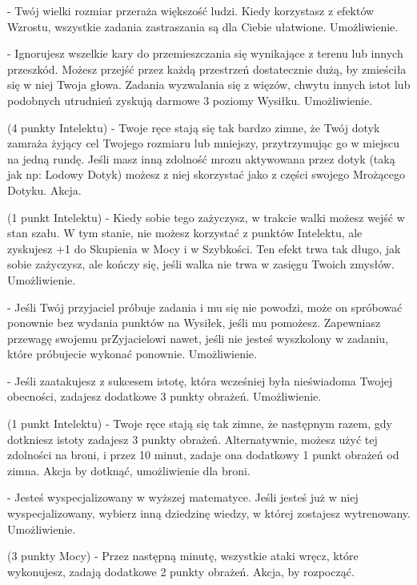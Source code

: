 { - Twój wielki rozmiar przeraża większość ludzi. Kiedy korzystasz z efektów Wzrostu, wszystkie zadania zastraszania są dla Ciebie ułatwione. Umożliwienie. 

 - Ignorujesz wszelkie kary do przemieszczania się wynikające z terenu lub innych przeszkód. Możesz przejść przez każdą przestrzeń dostatecznie dużą, by zmieściła się w niej Twoja głowa. Zadania wyzwalania się z więzów, chwytu innych istot lub podobnych utrudnień zyskują darmowe 3 poziomy Wysiłku. Umożliwienie. 

 (4 punkty Intelektu) - Twoje ręce stają się tak bardzo zimne, że Twój dotyk zamraża żyjący cel Twojego rozmiaru lub mniejszy, przytrzymując go w miejscu na jedną rundę. Jeśli masz inną zdolność mrozu aktywowana przez dotyk (taką jak np: Lodowy Dotyk) możesz z niej skorzystać jako z części swojego Mrożącego Dotyku. Akcja.

 (1 punkt Intelektu) - Kiedy sobie tego zażyczysz, w trakcie walki możesz wejść w stan szału. W tym stanie, nie możesz korzystać z punktów Intelektu, ale zyskujesz +1 do Skupienia w Mocy i w Szybkości. Ten efekt trwa tak długo, jak sobie zażyczysz, ale kończy się, jeśli walka nie trwa w zasięgu Twoich zmysłów. Umożliwienie.

 - Jeśli Twój przyjaciel próbuje zadania i mu się nie powodzi, może on spróbować ponownie bez wydania punktów na Wysiłek, jeśli mu pomożesz. Zapewniasz przewagę swojemu prZyjacielowi nawet, jeśli nie jesteś wyszkolony w zadaniu, które próbujecie wykonać ponownie. Umożliwienie. 

 - Jeśli zaatakujesz z sukcesem istotę, która wcześniej była nieświadoma Twojej obecności, zadajesz dodatkowe 3 punkty obrażeń. Umożliwienie.

 (1 punkt Intelektu) - Twoje ręce stają się tak zimne, że następnym razem, gdy dotkniesz istoty zadajesz 3 punkty obrażeń. Alternatywnie, możesz użyć tej zdolności na broni, i przez 10 minut, zadaje ona dodatkowy 1 punkt obrażeń od zimna. Akcja by dotknąć, umożliwienie dla broni.

 - Jesteś wyspecjalizowany w wyższej matematyce. Jeśli jesteś już w niej wyspecjalizowany, wybierz inną dziedzinę wiedzy, w której zostajesz wytrenowany. Umożliwienie. 

 (3 punkty Mocy) - Przez następną minutę, wszystkie ataki wręcz, które wykonujesz, zadają dodatkowe 2 punkty obrażeń. Akcja, by rozpocząć. 

}
